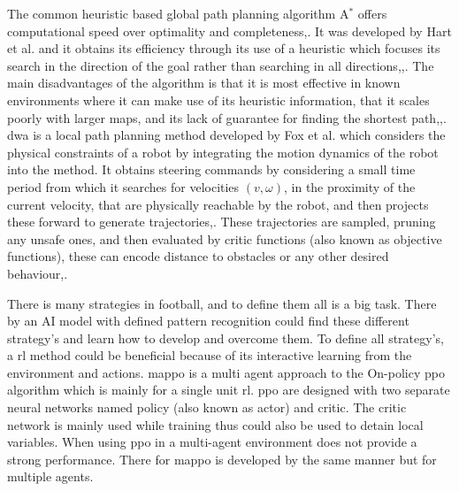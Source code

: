 The common heuristic based global path planning algorithm A$^*$ offers computational speed over optimality and completeness\:\cite{rachmawati_analysis_2020},\cite{foead_systematic_2021}. It was developed by Hart et al.\:\cite{hart_formal_1968} and it obtains its efficiency through its use of a heuristic which focuses its search in the direction of the goal rather than searching in all directions\:\cite{rachmawati_analysis_2020},\cite{foead_systematic_2021},\cite{bhateja_performance_2021}. The main disadvantages of the algorithm is that it is most effective in known environments where it can make use of its heuristic information, that it scales poorly with larger maps, and its lack of guarantee for finding the shortest path\:\cite{foead_systematic_2021},\cite{patel_comparative_2021},\cite{ogata_generic_2020}.
\ac{dwa} is a local path planning method developed by Fox et al. which considers the physical constraints of a robot by integrating the motion dynamics of the robot into the method\:\cite{fox_dynamic_1997}. It obtains steering commands by considering a small time period from which it searches for velocities $(v, \omega)$, in the proximity of the current velocity, that are physically reachable by the robot, and then projects these forward to generate trajectories\:\cite{fox_dynamic_1997},\cite{macenski_desks_2023}. These trajectories are sampled, pruning any unsafe ones, and then evaluated by critic functions (also known as objective functions), these can encode distance to obstacles or any other desired behaviour\:\cite{fox_dynamic_1997},\cite{macenski_desks_2023}.


There is many strategies in football, and to define them all is a big task. There by an AI model with defined pattern recognition could find these different strategy's and learn how to develop and overcome them. To define all strategy's, a \ac{rl} method could be beneficial because of its interactive learning from the environment and actions. \ac{mappo} is a multi agent approach to the On-policy \ac{ppo} algorithm which is mainly for a single unit \ac{rl}. \ac{ppo} are designed with two separate neural networks named policy (also known as actor) and critic. The critic network is mainly used while training thus could also be used to detain local variables. When using \ac{ppo} in a multi-agent environment does not provide a strong performance. There for \ac{mappo} is developed by the same manner but for multiple agents.

